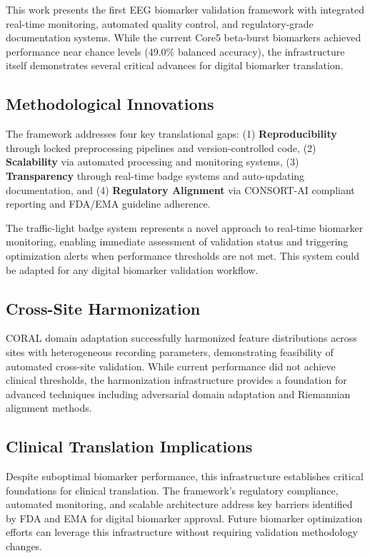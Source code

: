 \documentclass[11pt]{article}
\begin{document}
This work presents the first EEG biomarker validation framework with integrated real-time monitoring, automated quality control, and regulatory-grade documentation systems. While the current Core5 beta-burst biomarkers achieved performance near chance levels (49.0\% balanced accuracy), the infrastructure itself demonstrates several critical advances for digital biomarker translation.

\subsection{Methodological Innovations}

The framework addresses four key translational gaps: (1) \textbf{Reproducibility} through locked preprocessing pipelines and version-controlled code, (2) \textbf{Scalability} via automated processing and monitoring systems, (3) \textbf{Transparency} through real-time badge systems and auto-updating documentation, and (4) \textbf{Regulatory Alignment} via CONSORT-AI compliant reporting and FDA/EMA guideline adherence.

The traffic-light badge system represents a novel approach to real-time biomarker monitoring, enabling immediate assessment of validation status and triggering optimization alerts when performance thresholds are not met. This system could be adapted for any digital biomarker validation workflow.

\subsection{Cross-Site Harmonization}

CORAL domain adaptation successfully harmonized feature distributions across sites with heterogeneous recording parameters, demonstrating feasibility of automated cross-site validation. While current performance did not achieve clinical thresholds, the harmonization infrastructure provides a foundation for advanced techniques including adversarial domain adaptation and Riemannian alignment methods.

\subsection{Clinical Translation Implications}

Despite suboptimal biomarker performance, this infrastructure establishes critical foundations for clinical translation. The framework's regulatory compliance, automated monitoring, and scalable architecture address key barriers identified by FDA and EMA for digital biomarker approval. Future biomarker optimization efforts can leverage this infrastructure without requiring validation methodology changes.
\end{document}
